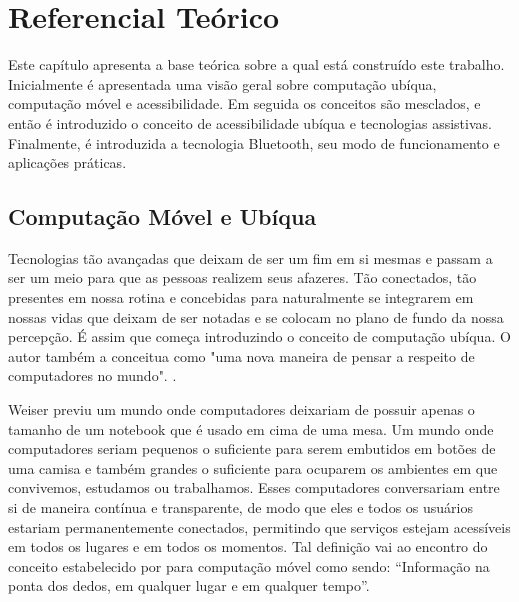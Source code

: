 \documentclass[english,brazilian]{UNISINOSmonografia}
\begin{document}
\chapter{Referencial Teórico}
Este capítulo apresenta a base teórica sobre a qual está construído este trabalho. Inicialmente é apresentada uma visão geral sobre computação ubíqua, computação móvel e acessibilidade. Em seguida os conceitos são mesclados, e então é introduzido o conceito de acessibilidade ubíqua e tecnologias assistivas. Finalmente, é introduzida a tecnologia Bluetooth, seu modo de funcionamento e aplicações práticas.


	\section{Computação Móvel e Ubíqua}
Tecnologias tão avançadas que deixam de ser um fim em si mesmas e passam a ser um meio para que as pessoas realizem seus afazeres. Tão conectados, tão presentes em nossa rotina e concebidas para naturalmente se integrarem em nossas vidas que deixam de ser notadas e se colocam no plano de fundo da nossa percepção. É assim que  começa introduzindo o conceito de computação ubíqua. O autor também a conceitua como "uma nova maneira de pensar a respeito de computadores no mundo". \cite{Weiser1991}.

Weiser previu um mundo onde computadores deixariam de possuir apenas o tamanho de um notebook que é usado em cima de uma mesa. Um mundo onde computadores seriam pequenos o suficiente para serem embutidos em botões de uma camisa e também grandes o suficiente para ocuparem os ambientes em que convivemos, estudamos ou trabalhamos. Esses computadores conversariam entre si de maneira contínua e transparente, de modo que eles e todos os usuários estariam permanentemente conectados, permitindo que serviços estejam acessíveis em todos os lugares e em todos os momentos. Tal definição vai ao encontro do conceito estabelecido por  para computação móvel como sendo: “Informação na ponta dos dedos, em qualquer lugar e em qualquer tempo”.
\end{document}
